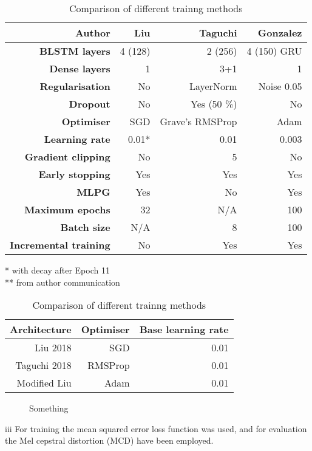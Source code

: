 \documentclass[a4paper]{article}
\begin{document}
\begin{table}[th]
  \caption{Comparison of different trainng methods}
  \label{tab:example}
  \centering
  \footnotesize

  \begin{tabular}{ r r r r }
    \toprule
    \textbf{Author} & \textbf{Liu} & \textbf{Taguchi} & \textbf{Gonzalez} \\
    \midrule
    \textbf{BLSTM layers} & 4 (128) & 2 (256) & 4 (150) GRU \\
    \textbf{Dense layers} & 1 & 3+1 & 1 \\
    \textbf{Regularisation} & No & LayerNorm & Noise 0.05 \\
    \textbf{Dropout} & No & Yes (50 \%) & No \\
    \textbf{Optimiser} & SGD & Grave's RMSProp & Adam \\
    \textbf{Learning rate} & 0.01* & 0.01 & 0.003 \\
    \textbf{Gradient clipping} & No & 5 & No \\
    \textbf{Early stopping} & Yes & Yes & Yes \\
    \textbf{MLPG} & Yes & No & Yes \\ 
    \textbf{Maximum epochs} & 32 & N/A & 100 \\
    \textbf{Batch size} & N/A & 8 & 100 \\
    \textbf{Incremental training} & No & Yes & Yes \\
    \bottomrule
  \end{tabular}
  * with decay after Epoch 11 \\
  ** from author communication
\end{table}
\begin{table}[th]
  \caption{Comparison of different trainng methods}
  \label{tab:example}
  \centering
  \begin{tabular}{ r r r }
    \toprule
    \textbf{Architecture} & \textbf{Optimiser} & \textbf{Base learning rate} \\
    \midrule
    Liu 2018 & SGD & 0.01 \\
    Taguchi 2018 & RMSProp & 0.01       \\
    Modified Liu & Adam & 0.01               \\
    \bottomrule
  \end{tabular}
  
\end{table}

\begin{figure}[t]
  \begin{center}
    \scalebox{0.75}{}
    \caption{Something}
\end{center}
\end{figure}
iii
For training the mean squared error loss function was used, and for
evaluation the Mel cepstral distortion (MCD) have been employed. \cite{Kubichek1993}
\end{document}
